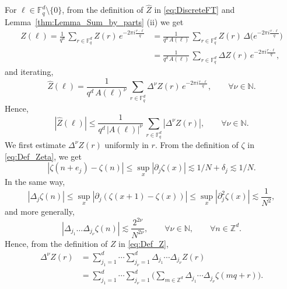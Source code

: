 \documentclass[11pt,reqno]{amsart}
\theoremstyle{definition}
\numberwithin{equation}{section}
\theoremstyle{remark}
\begin{document}
For $\ell \in \mathbb F_q^d \setminus \{0\}$, 
from the definition of $\widehat Z$ in \eqref{eq:DiscreteFT}
and Lemma~\ref{thm:Lemma_Sum_by_parts} (ii) we get
\begin{equation}
\begin{split}
    \widehat Z(\ell) = \frac{1}{q^d} \, \sum_{r \in \mathbb F_q^d} Z(r) \, e^{-2\pi i \frac{r \cdot \ell}{q}}
    & = \frac{1}{q^d \, A(\ell)} \, \sum_{r \in \mathbb F_q^d} Z(r) \, \Delta\Big( e^{-2\pi i \frac{r \cdot \ell}{q}} \Big) \\
    & = \frac{1}{q^d \, A(\ell)} \, \sum_{r \in \mathbb F_q^d} \Delta Z(r) \,  e^{-2\pi i \frac{r \cdot \ell}{q}},
    \end{split}
\end{equation}
and iterating,
\begin{equation}
    \widehat Z(\ell) 
    = 
    \frac{1}{q^d \, A(\ell)^\nu} \, \sum_{r \in \mathbb F_q^d} \Delta^\nu Z(r) \,  e^{-2\pi i \frac{r \cdot \ell}{q}}, \qquad \forall \nu \in \mathbb N. 
\end{equation}
Hence, 
\begin{equation}\label{eq:Bound_Z_Hat_Iterated}
    |\widehat Z(\ell)| \leq \frac{1}{q^d \, |A(\ell)|^\nu} \, \sum_{r \in \mathbb F_q^d} |\Delta^\nu Z(r)|, 
    \qquad \forall \nu \in \mathbb N.
\end{equation}
We first estimate $\Delta^\nu Z(r)$ uniformly in $r$. 
From the definition of $\zeta$ in \eqref{eq:Def_Zeta}, we get 
\begin{equation}
    |\zeta(n+e_j) - \zeta(n)| 
    \leq \sup_x |\partial_j\zeta(x)| 
    \lesssim 1/N + \delta_j \lesssim 1/N.
\end{equation}
In the same way, 
\begin{equation}
    |\Delta_j \zeta(n)| 
    \leq \sup_x |\partial_j (\zeta(x+1) - \zeta(x))|
    \leq \sup_x |\partial_j^2 \zeta(x)| 
    \lesssim \frac{1}{N^2}, 
\end{equation}
and more generally, 
\begin{equation}
        |\Delta_{j_1} \ldots \Delta_{j_\nu} \zeta(n)| \lesssim \frac{2^{2\nu}}{N^{2\nu}}, \qquad \forall \nu \in \mathbb N, 
        \qquad \forall n \in \mathbb Z^d.
\end{equation}
Hence, from the definition of $Z$ in \eqref{eq:Def_Z}, 
\begin{equation}
\begin{split}
     \Delta^\nu Z(r) 
      & = \sum_{j_1=1}^d \cdots \sum_{j_\nu=1}^d \Delta_{j_1} \cdots \Delta_{j_\nu} Z(r) \\
     & = \sum_{j_1=1}^d \cdots \sum_{j_\nu=1}^d \Big( \sum_{m \in \mathbb Z^d}\Delta_{j_1} \cdots \Delta_{j_\nu} \zeta(mq+r) \Big).
\end{split}
\end{equation}
\end{document}
